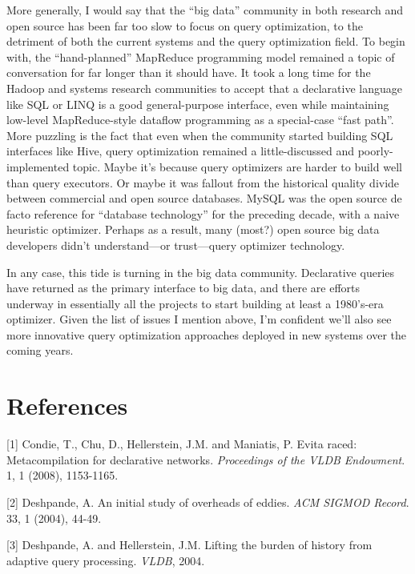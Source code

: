 \documentclass[b5paper,11pt,twoside,openright]{book}
\begin{document}
More generally, I would say that the ``big data'' community in both
research and open source has been far too slow to focus on query
optimization, to the detriment of both the current systems and the query
optimization field. To begin with, the ``hand-planned'' MapReduce
programming model remained a topic of conversation for far longer than
it should have. It took a long time for the Hadoop and systems research
communities to accept that a declarative language like SQL or LINQ is a
good general-purpose interface, even while maintaining low-level
MapReduce-style dataflow programming as a special-case ``fast path''.
More puzzling is the fact that even when the community started building
SQL interfaces like Hive, query optimization remained a little-discussed
and poorly-implemented topic. Maybe it's because query optimizers are
harder to build well than query executors. Or maybe it was fallout from
the historical quality divide between commercial and open source
databases. MySQL was the open source de facto reference for ``database
technology'' for the preceding decade, with a naive heuristic optimizer.
Perhaps as a result, many (most?) open source big data developers didn't
understand---or trust---query optimizer technology.

In any case, this tide is turning in the big data community. Declarative
queries have returned as the primary interface to big data, and there
are efforts underway in essentially all the projects to start building
at least a 1980's-era optimizer. Given the list of issues I mention
above, I'm confident we'll also see more innovative query optimization
approaches deployed in new systems over the coming years.

\section*{References}

\leavevmode\hypertarget{ref-condie2008evita}{}%
{[}1{]} Condie, T., Chu, D., Hellerstein, J.M. and Maniatis, P. Evita
raced: Metacompilation for declarative networks. \emph{Proceedings of
  the VLDB Endowment}. 1, 1 (2008), 1153-1165.

\leavevmode\hypertarget{ref-deshpande2004initial}{}%
{[}2{]} Deshpande, A. An initial study of overheads of eddies. \emph{ACM
  SIGMOD Record}. 33, 1 (2004), 44-49.

\leavevmode\hypertarget{ref-deshpande2004lifting}{}%
{[}3{]} Deshpande, A. and Hellerstein, J.M. Lifting the burden of
history from adaptive query processing. \emph{VLDB}, 2004.
\end{document}
